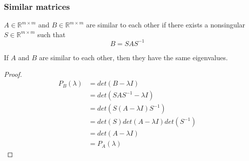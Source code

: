 \begin{multicols}{2}
\subsubsection{Similar matrices}
\begin{definition}
    $A\in\mathbb{R}^{m\times m}$ and $B\in\mathbb{R}^{m\times m}$ are similar to each other if there exists a nonsingular $S\in\mathbb{R}^{m\times m}$ such that 
    \[
        B=SAS^{-1}
    \]
\end{definition}
If $A$ and $B$ are similar to each other, then they have the same eigenvalues. \\
\begin{proof}
    \[
        \begin{array}{ll}
            P_B(\lambda)&=det(B-\lambda I) \\
            &= det(SAS^{-1}-\lambda I) \\
            &= det(S(A-\lambda I)S^{-1}) \\
            &= det(S)det(A-\lambda I)det(S^{-1}) \\
            &= det(A-\lambda I) \\
            &= P_A(\lambda)
        \end{array}    
    \]
\end{proof}


\end{multicols}
